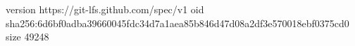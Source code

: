 version https://git-lfs.github.com/spec/v1
oid sha256:6d6bf0adba39660045fdc34d7a1aea85b846d47d08a2df3e570018ebf0375cd0
size 49248
